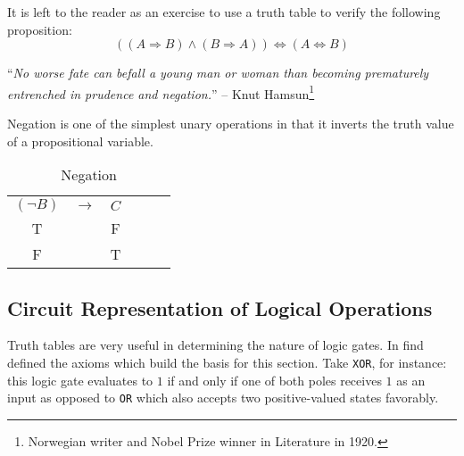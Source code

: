 \begin{exm}\label{exm-logical-equivalent}
    It is left to the reader as an exercise to use a truth table to verify the
    following proposition:
    \begin{equation}
        \left((A \Rightarrow B) \land (B \Rightarrow A)\right) \Leftrightarrow (A \Leftrightarrow B)
    \end{equation}
\end{exm}

\begin{displayquote}
    ``\emph{No worse fate can befall a young man or woman than becoming prematurely
    entrenched in prudence and negation.}''
    -- Knut Hamsun\footnote{Norwegian writer and Nobel Prize winner in Literature
    in 1920.}
\end{displayquote}

Negation is one of the simplest unary operations in that it inverts the truth
value of a propositional variable.

\begin{table}[hbt!]
    \centering
    \begin{tabular}{*{6}{c}}
        $(\neg B)$ & $\rightarrow$ & $C$ \\
                 T &               & F   \\
                 F &               & T   \\
    \end{tabular}
    \caption{Negation}\label{table-negation}
\end{table}


\subsection{Circuit Representation of Logical Operations}\label{subsec-circuit-representation}

Truth tables are very useful in determining the nature of logic gates.
In  find defined the axioms which build the basis for
this section. Take \texttt{XOR}, for instance: this logic gate evaluates to $1$
if and only if one of both poles receives $1$ as an input as opposed to \texttt{OR}
which also accepts two positive-valued states favorably.


